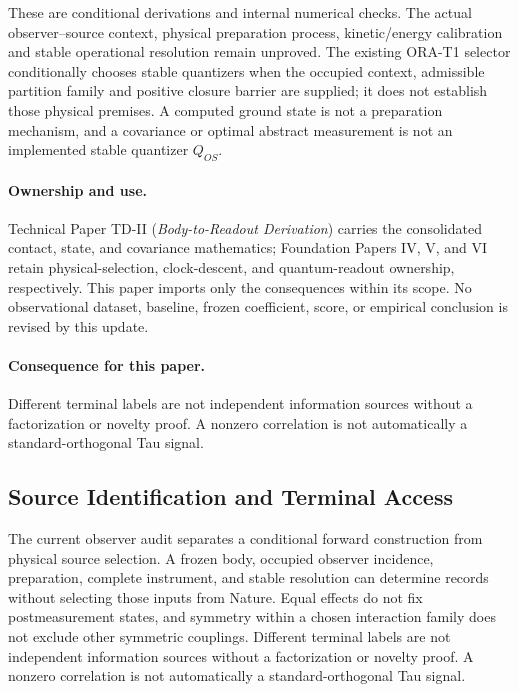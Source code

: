 \documentclass[11pt]{article}
\begin{document}
These are conditional derivations and internal numerical checks. The actual
observer--source context, physical preparation process, kinetic/energy
calibration and stable operational resolution remain unproved. The existing
ORA-T1 selector conditionally chooses stable quantizers when the occupied
context, admissible partition family and positive closure barrier are supplied;
it does not establish those physical premises. A computed ground state is not
a preparation mechanism, and a covariance or optimal abstract measurement is
not an implemented stable quantizer $Q_{OS}$.

\paragraph{Ownership and use.}
Technical Paper TD-II (\emph{Body-to-Readout Derivation}) carries the
consolidated contact, state, and covariance mathematics; Foundation Papers IV,
V, and VI retain physical-selection, clock-descent, and quantum-readout
ownership, respectively. This paper imports only the consequences within its
scope. No observational dataset, baseline, frozen coefficient, score, or
empirical conclusion is revised by this update.

\paragraph{Consequence for this paper.}
Different terminal labels are not independent information sources without a
factorization or novelty proof. A nonzero correlation is not automatically a
standard-orthogonal Tau signal.

\subsection{Source Identification and Terminal Access}
The current observer audit separates a conditional forward construction from
physical source selection. A frozen body, occupied observer incidence,
preparation, complete instrument, and stable resolution can determine records
without selecting those inputs from Nature. Equal effects do not fix
postmeasurement states, and symmetry within a chosen interaction family does
not exclude other symmetric couplings. Different terminal labels are not
independent information sources without a factorization or novelty proof. A
nonzero correlation is not automatically a standard-orthogonal Tau signal.
\end{document}

